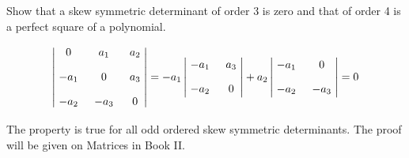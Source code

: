 \documentclass[11pt]{amsbook}
\begin{document}
\begin{hEnumerateArabic}
    \item Show that a skew symmetric determinant of order 3 is zero and that of order 4 is a perfect square of a polynomial.
    \-
    \begin{hSolution}
        \begin{align*}
            \begin{vmatrix}
                \xymatrix @R=3mm @C=3mm {
                     0   & a_1  & a_2   \\
                    -a_1 & 0    & a_3   \\
                    -a_2 & -a_3 & 0
                }
            \end{vmatrix}
            = -a_1
            \begin{vmatrix}
                \xymatrix @R=3mm @C=3mm {
                    -a_1 & a_3  \\
                    -a_2 & 0
                }
            \end{vmatrix}
            + a_2
            \begin{vmatrix}
                \xymatrix @R=3mm @C=3mm {
                    -a_1 & 0    \\
                    -a_2 & -a_3
                }
            \end{vmatrix}
            = 0
        \end{align*}
        \par The property is true for all odd ordered skew symmetric determinants. The proof will be given on Matrices in Book II.
    \end{hSolution}
    \end{hEnumerateArabic}
\end{document}
